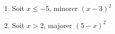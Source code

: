 
\begin{enumerate}
\item Soit $x\leq -5$, minorer $\left(x-3 \right)^2$
\item Soit $x > 2$, majorer $\left(5-x \right)^2$
\end{enumerate}
